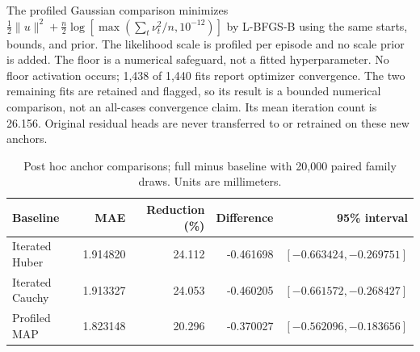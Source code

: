 The profiled Gaussian comparison minimizes $\frac12\|u\|^2+\frac{n}{2}\log[\max(\sum_t\nu_t^2/n,10^{-12})]$ by L-BFGS-B using the same starts, bounds, and prior. The likelihood scale is profiled per episode and no scale prior is added. The floor is a numerical safeguard, not a fitted hyperparameter. No floor activation occurs; 1,438 of 1,440 fits report optimizer convergence. The two remaining fits are retained and flagged, so its result is a bounded numerical comparison, not an all-cases convergence claim. Its mean iteration count is 26.156. Original residual heads are never transferred to or retrained on these new anchors.
\begin{table}[htbp]\centering\small
\caption{Post hoc anchor comparisons; full minus baseline with 20,000 paired family draws. Units are millimeters.}\label{tab:ext_anchor}
\begin{tabular}{lrrrr}\toprule
Baseline & MAE & Reduction (\%) & Difference & 95\% interval\\\midrule
Iterated Huber & 1.914820 & 24.112 & -0.461698 & $[-0.663424,-0.269751]$\\
Iterated Cauchy & 1.913327 & 24.053 & -0.460205 & $[-0.661572,-0.268427]$\\
Profiled MAP & 1.823148 & 20.296 & -0.370027 & $[-0.562096,-0.183656]$\\
\bottomrule\end{tabular}
\end{table}
